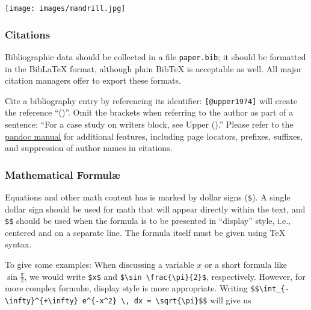 \documentclass[10pt,a4paper,onecolumn]{article}
\let\origfigure\figure
\let\endorigfigure\endfigure
\renewenvironment{figure}[1][2] {
    \expandafter\origfigure\expandafter[H]
} {
    \endorigfigure
}
\begin{document}
\begin{figure}
\centering
\texttt{[image: images/mandrill.jpg]}
\caption{The ``Mandrill'' standard test image, sometimes erroneously
called ``Baboon'', is a popular sample photo and used in image
processing research.}\label{fig:mandrill}
\end{figure}

\subsubsection{Citations}\label{citations}

Bibliographic data should be collected in a file \texttt{paper.bib}; it
should be formatted in the BibLaTeX format, although plain BibTeX is
acceptable as well. All major citation managers offer to export these
formats.

Cite a bibliography entry by referencing its identifier:
\texttt{{[}@upper1974{]}} will create the reference
``()''. Omit the brackets when
referring to the author as part of a sentence: ``For a case study on
writers block, see Upper ().'' Please
refer to the
\href{https://pandoc.org/MANUAL\#extension-citations}{pandoc manual} for
additional features, including page locators, prefixes, suffixes, and
suppression of author names in citations.

\subsubsection{Mathematical Formulæ}\label{mathematical-formuluxe6}

Equations and other math content has is marked by dollar signs
(\texttt{\$}). A single dollar sign should be used for math that will
appear directly within the text, and \texttt{\$\$} should be used when
the formula is to be presented in ``display'' style, i.e., centered and
on a separate line. The formula itself must be given using TeX syntax.

To give some examples: When discussing a variable \(x\) or a short
formula like \(\sin \frac{\pi}{2}\), we would write \texttt{\$x\$} and
\texttt{\$\textbackslash{}sin\ \textbackslash{}frac\{\textbackslash{}pi\}\{2\}\$},
respectively. However, for more complex formulæ, display style is more
appropriate. Writing
\texttt{\$\$\textbackslash{}int\_\{-\textbackslash{}infty\}\^{}\{+\textbackslash{}infty\}\ e\^{}\{-x\^{}2\}\ \textbackslash{},\ dx\ =\ \textbackslash{}sqrt\{\textbackslash{}pi\}\$\$}
will give us
\end{document}
